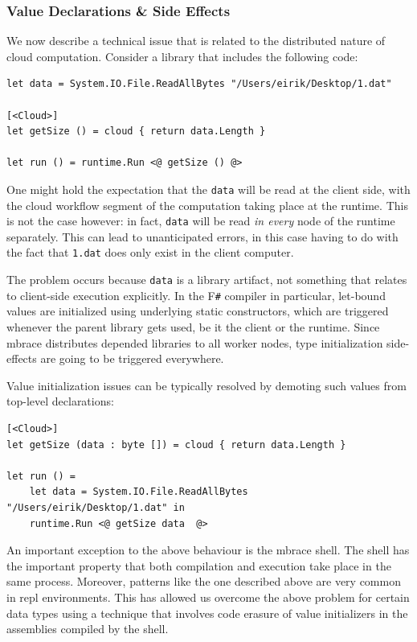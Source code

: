 \documentclass[9pt,a4paper]{article}
\newcommand{\mbrace}{mbrace}
\newcommand{\fsharp}{F\texttt \#}
\begin{document}
\subsubsection*{Value Declarations \& Side Effects}

We now describe a technical issue that is related to the distributed nature of cloud computation.
Consider a library that includes the following code:
\begin{lstlisting}
let data = System.IO.File.ReadAllBytes "/Users/eirik/Desktop/1.dat"

[<Cloud>]
let getSize () = cloud { return data.Length }

let run () = runtime.Run <@ getSize () @>
\end{lstlisting}
One might hold the expectation that the \texttt{data} will be read at the client side,
with the cloud workflow segment of the computation taking place at the runtime.
This is not the case however: in fact, \texttt{data} will be read \emph{in every}
node of the runtime separately. This can lead to unanticipated errors, in this case
having to do with the fact that \texttt{1.dat} does only exist in the client computer.

The problem occurs because \texttt{data} is a library artifact, not something
that relates to client-side execution explicitly. In the \fsharp{} compiler in particular,
let-bound values are initialized using underlying static constructors, which are triggered
whenever the parent library gets used, be it the client or the runtime.
Since \mbrace{} distributes depended libraries to all worker nodes, type initialization 
side-effects are going to be triggered everywhere.

Value initialization issues can be typically resolved by demoting such values from top-level
declarations:
\begin{lstlisting}
[<Cloud>]
let getSize (data : byte []) = cloud { return data.Length }

let run () = 
	let data = System.IO.File.ReadAllBytes "/Users/eirik/Desktop/1.dat" in
	runtime.Run <@ getSize data  @>
\end{lstlisting}

An important exception to the above behaviour is the \mbrace{} shell. The shell has the 
important property that both compilation and execution take place in the same process. 
Moreover, patterns like the one described above are very common in repl environments.
This has allowed us overcome the above problem for certain data types using a technique
that involves code erasure of value initializers in the assemblies compiled by the shell.
\end{document}
